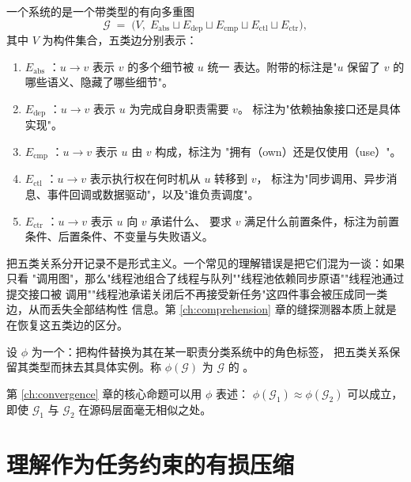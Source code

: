 \begin{definition}[架构关系型]\label{def:relgraph}
一个系统的是一个带类型的有向多重图
\begin{equation}\label{eq:relgraph}
\mathcal{G} \;=\; \bigl(V,\; E_{\mathrm{abs}} \sqcup E_{\mathrm{dep}} \sqcup
E_{\mathrm{cmp}} \sqcup E_{\mathrm{ctl}} \sqcup E_{\mathrm{ctr}}\bigr),
\end{equation}
其中 $V$ 为构件集合，五类边分别表示：
\begin{enumerate}[label=(\alph*)]
\item $E_{\mathrm{abs}}$ ：$u \to v$ 表示 $v$ 的多个细节被 $u$ 统一
      表达。附带的标注是"$u$ 保留了 $v$ 的哪些语义、隐藏了哪些细节"。
\item $E_{\mathrm{dep}}$ ：$u \to v$ 表示 $u$ 为完成自身职责需要 $v$。
      标注为"依赖抽象接口还是具体实现"。
\item $E_{\mathrm{cmp}}$ ：$u \to v$ 表示 $u$ 由 $v$ 构成，标注为
      "拥有（own）还是仅使用（use）"。
\item $E_{\mathrm{ctl}}$ ：$u \to v$ 表示执行权在何时机从 $u$ 转移到 $v$，
      标注为"同步调用、异步消息、事件回调或数据驱动"，以及"谁负责调度"。
\item $E_{\mathrm{ctr}}$ ：$u \to v$ 表示 $u$ 向 $v$ 承诺什么、
      要求 $v$ 满足什么前置条件，标注为前置条件、后置条件、不变量与失败语义。
\end{enumerate}
\end{definition}

把五类关系分开记录不是形式主义。一个常见的理解错误是把它们混为一谈：如果只看
"调用图"，那么"线程池组合了线程与队列""线程池依赖同步原语""线程池通过提交接口被
调用""线程池承诺关闭后不再接受新任务"这四件事会被压成同一类边，从而丢失全部结构性
信息。第 \ref{ch:comprehension} 章的缝探测器本质上就是在恢复这五类边的区分。

\begin{definition}[抽象骨架]\label{def:skeleton}
设 $\phi$ 为一个：把构件替换为其在某一职责分类系统中的角色标签，
把五类关系保留其类型而抹去其具体实例。称 $\phi(\mathcal{G})$ 为 $\mathcal{G}$ 的
。
\end{definition}

第 \ref{ch:convergence} 章的核心命题可以用 $\phi$ 表述：
$\phi(\mathcal{G}_1) \approx \phi(\mathcal{G}_2)$ 可以成立，即使
$\mathcal{G}_1$ 与 $\mathcal{G}_2$ 在源码层面毫无相似之处。

\section{理解作为任务约束的有损压缩}\label{sec:comprehension-formal}


